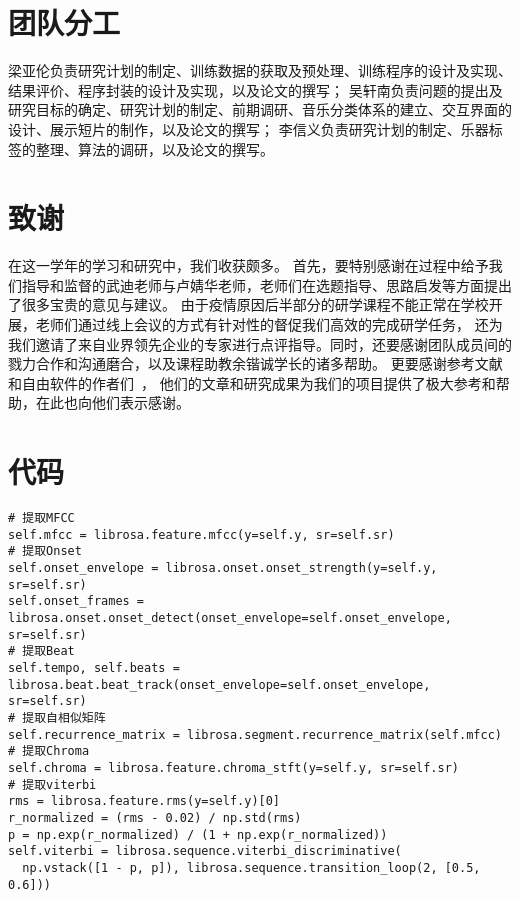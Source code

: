 \documentclass[a4paper,utf8,10pt]{article}
\begin{document}
\section{团队分工}

梁亚伦负责研究计划的制定、训练数据的获取及预处理、训练程序的设计及实现、结果评价、程序封装的设计及实现，以及论文的撰写；
吴轩南负责问题的提出及研究目标的确定、研究计划的制定、前期调研、音乐分类体系的建立、交互界面的设计、展示短片的制作，以及论文的撰写；
李信义负责研究计划的制定、乐器标签的整理、算法的调研，以及论文的撰写。

\section{致谢}

在这一学年的学习和研究中，我们收获颇多。
首先，要特别感谢在过程中给予我们指导和监督的武迪老师与卢婧华老师，老师们在选题指导、思路启发等方面提出了很多宝贵的意见与建议。
由于疫情原因后半部分的研学课程不能正常在学校开展，老师们通过线上会议的方式有针对性的督促我们高效的完成研学任务，
还为我们邀请了来自业界领先企业的专家进行点评指导。同时，还要感谢团队成员间的戮力合作和沟通磨合，以及课程助教余锴诚学长的诸多帮助。
更要感谢参考文献和自由软件的作者们~\cite{tf15}\cite{CC01a}\cite{lstm15}\cite{boixx14}\cite{librosa18}\cite{lstm18}，
他们的文章和研究成果为我们的项目提供了极大参考和帮助，在此也向他们表示感谢。

{}


\appendix

\section{代码}

 \label{lst:music}
\begin{verbatim}
# 提取MFCC
self.mfcc = librosa.feature.mfcc(y=self.y, sr=self.sr)
# 提取Onset
self.onset_envelope = librosa.onset.onset_strength(y=self.y, sr=self.sr)
self.onset_frames = librosa.onset.onset_detect(onset_envelope=self.onset_envelope, sr=self.sr)
# 提取Beat
self.tempo, self.beats = librosa.beat.beat_track(onset_envelope=self.onset_envelope, sr=self.sr)
# 提取自相似矩阵
self.recurrence_matrix = librosa.segment.recurrence_matrix(self.mfcc)
# 提取Chroma
self.chroma = librosa.feature.chroma_stft(y=self.y, sr=self.sr)
# 提取viterbi
rms = librosa.feature.rms(y=self.y)[0]
r_normalized = (rms - 0.02) / np.std(rms)
p = np.exp(r_normalized) / (1 + np.exp(r_normalized))
self.viterbi = librosa.sequence.viterbi_discriminative(
  np.vstack([1 - p, p]), librosa.sequence.transition_loop(2, [0.5, 0.6]))
\end{verbatim}
\end{document}
